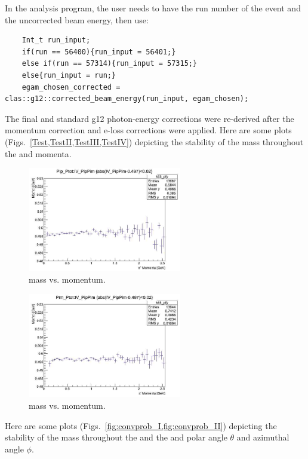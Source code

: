 In the analysis program, the user needs to have the run number of the event and the uncorrected beam energy, then use:
\begin{verbatim}
	Int_t run_input;
    if(run == 56400){run_input = 56401;}
    else if(run == 57314){run_input = 57315;}
    else{run_input = run;}
    egam_chosen_corrected = clas::g12::corrected_beam_energy(run_input, egam_chosen);
\end{verbatim}
The final and standard g12 photon-energy corrections were re-derived after the momentum correction and e-loss corrections were applied.
Here are some plots (Figs.~\ref{Test,TestII,TestIII,TestIV}) depicting the stability of the \Ks mass throughout the \pip and \pim momenta.

\begin{figure}\begin{center}
		\includegraphics[width=0.6\textwidth]{MK_Response/MassvspIP.jpg}
		\caption[\Ks mass vs. \pip momentum.]{\label{fig:convprob_I} \Ks mass vs. \pip momentum.}
	\end{center}\end{figure}

\begin{figure}\begin{center}
		\includegraphics[width=0.6\textwidth]{MK_Response/Massvspim.jpg}
		\caption[\Ks mass vs. \pim momentum.]{\label{fig:convprob_II} \Ks mass vs. \pim momentum.}
	\end{center}\end{figure}
	Here are some plots (Figs.~\ref{fig:convprob_I,fig:convprob_II}) depicting the stability of the \Ks mass throughout the \pip and \pim the \pip and \pim polar angle $\theta$ and azimuthal angle $\phi$.
	
